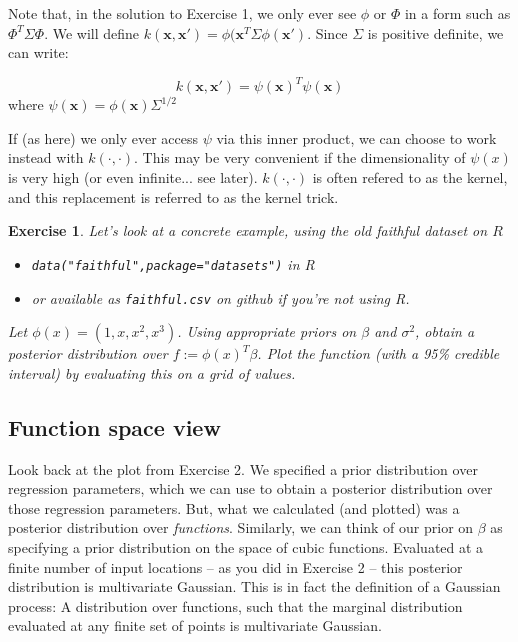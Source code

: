 \documentclass[twoside]{article}
\newcounter{lecnum}
\newtheorem{exercise}{Exercise}[lecnum]
\begin{document}
Note that, in the solution to Exercise 1, we only ever see $\phi$ or $\Phi$ in a form such as $\Phi^T\Sigma\Phi$. We will define $k(\mathbf{x},\mathbf{x}') = \phi(\mathbf{x}^T\Sigma\phi(\mathbf{x}')$. Since $\Sigma$ is positive definite, we can write:

$$k(\mathbf{x},\mathbf{x}') = \psi(\mathbf{x})^T\psi(\mathbf{x})$$
where $\psi(\mathbf{x}) = \phi(\mathbf{x})\Sigma^{1/2}$

If (as here) we only ever access $\psi$ via this inner product, we can choose to work instead with $k(\cdot,\cdot)$. This may be very convenient if the dimensionality of $\psi(x)$ is very high (or even infinite... see later). $k(\cdot,\cdot)$ is often refered to as the kernel, and this replacement is referred to as the kernel trick.

\begin{exercise}

  Let's look at a concrete example, using the old faithful dataset on $R$
  \begin{itemize}
  \item \texttt{data("faithful",package="datasets")} in R
  \item or available as \texttt{faithful.csv} on github if you're not using R.
  \end{itemize}

  Let $\phi(x) = (1,x,x^2,x^3)$. Using appropriate priors on $\beta$ and $\sigma^2$, obtain a posterior distribution over $f:=\phi(x)^T\beta$. Plot the function (with a 95\% credible interval) by evaluating this on a grid of values.
\end{exercise}
  


\subsection{Function space view}

Look back at the plot from Exercise 2. We specified a prior distribution over regression parameters, which we can use to obtain a posterior distribution over those regression parameters. But, what we calculated (and plotted) was a posterior distribution over \textit{functions}. Similarly, we can think of our prior on $\beta$ as specifying a prior distribution on the space of cubic functions. Evaluated at a finite number of input locations -- as you did in Exercise 2 -- this posterior distribution is multivariate Gaussian. This is in fact the definition of a Gaussian process: A distribution over functions, such that the marginal distribution evaluated at any finite set of points is multivariate Gaussian.
\end{document}
